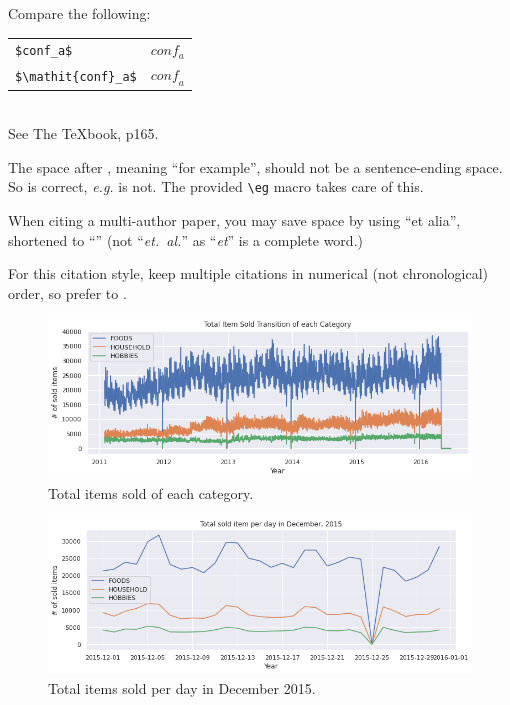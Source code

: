 \documentclass[10pt,twocolumn,letterpaper]{article}
\begin{document}
\noindent
Compare the following:\\
\begin{tabular}{ll}
 \verb'$conf_a$' &  $conf_a$ \\
 \verb'$\mathit{conf}_a$' & $\mathit{conf}_a$
\end{tabular}\\
See The \TeX book, p165.

The space after \eg, meaning ``for example'', should not be a
sentence-ending space. So \eg is correct, {\em e.g.} is not.  The provided
\verb'\eg' macro takes care of this.

When citing a multi-author paper, you may save space by using ``et alia'',
shortened to ``\etal'' (not ``{\em et.\ al.}'' as ``{\em et}'' is a complete word.)

For this citation style, keep multiple citations in numerical (not
chronological) order, so prefer \cite{Alpher03,Alpher02,Authors06} to
\cite{Alpher02,Alpher03,Authors06}.


\begin{figure}
  \begin{center}
    \includegraphics[width=0.8\linewidth]{img/totalItemSoldofEachCategory.png}
  \end{center}
    \caption{Total items sold of each category.}
  \label{fig:short}
\end{figure}

\begin{figure}
  \begin{center}
    \includegraphics[width=0.8\linewidth]{img/totalSoldItemPerDayDec2015.png}
  \end{center}
    \caption{Total items sold per day in December 2015.}
  \label{fig:short}
\end{figure}
\end{document}
